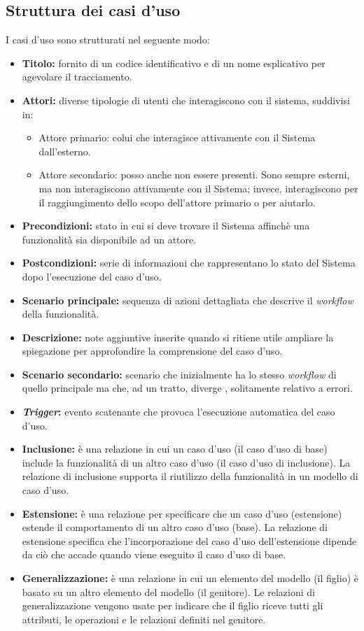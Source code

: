 \subsection{Struttura dei casi d'uso}
I casi d'uso sono strutturati nel seguente modo:
\begin{itemize}
	\item \textbf{Titolo:} fornito di un codice identificativo e di un nome esplicativo per agevolare il tracciamento.
	\item \textbf{Attori:} diverse tipologie di utenti che interagiscono con il sistema, suddivisi in:
	\begin{itemize}
		\item Attore primario: colui che interagisce attivamente con il Sistema dall'esterno.
		\item Attore secondario: posso anche non essere presenti. 
		Sono sempre esterni, ma non interagiscono attivamente con il Sistema; invece, interagiscono per il raggiungimento dello scopo dell'attore primario o per aiutarlo.
	\end{itemize}
	\item \textbf{Precondizioni:} stato in cui si deve trovare il Sistema affinchè una funzionalità sia disponibile ad un attore.
	\item \textbf{Postcondizioni:} serie di informazioni che rappresentano lo stato del Sistema dopo l'esecuzione del caso d'uso.
	\item \textbf{Scenario principale:} sequenza di azioni dettagliata che descrive il \textit{workflow} della funzionalità.
	\item \textbf{Descrizione:} note aggiuntive inserite quando si ritiene utile ampliare la spiegazione per approfondire la comprensione del caso d'uso.
	\item \textbf{Scenario secondario:} scenario che inizialmente ha lo stesso \textit{workflow} di quello principale ma che, ad un tratto, diverge , solitamente relativo a errori.
	\item \textbf{\textit{Trigger}:} evento scatenante che provoca l'esecuzione automatica del caso d'uso.
	\item \textbf{Inclusione:} è una relazione in cui un caso d'uso (il caso d'uso di base) include la funzionalità di un altro caso d'uso (il caso d'uso di inclusione). 
		La relazione di inclusione supporta il riutilizzo della funzionalità in un modello di caso d'uso.
	\item \textbf{Estensione:} è una relazione per specificare che un caso d'uso (estensione) estende il comportamento di un altro caso d'uso (base).
	La relazione di estensione specifica che l'incorporazione del caso d'uso dell'estensione dipende da ciò che accade quando viene eseguito il caso d'uso di base.
	\item \textbf{Generalizzazione:} è una relazione in cui un elemento del modello (il figlio) è basato su un altro elemento del modello (il genitore). 
		Le relazioni di generalizzazione vengono usate per indicare che il figlio riceve tutti gli attributi, le operazioni e le relazioni definiti nel genitore.
\end{itemize}

